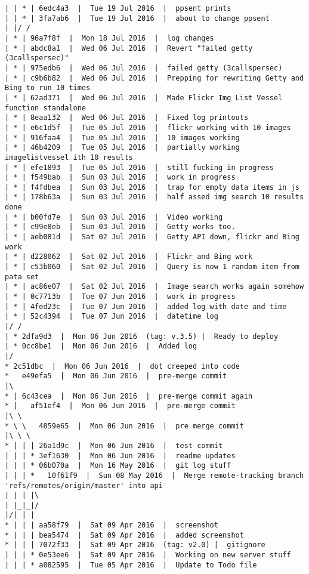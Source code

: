 \begin{verbatim}
| | * | 6edc4a3  |  Tue 19 Jul 2016  |  ppsent prints
| | * | 3fa7ab6  |  Tue 19 Jul 2016  |  about to change ppsent
| |/ /  
| * | 96a7f8f  |  Mon 18 Jul 2016  |  log changes
| * | abdc8a1  |  Wed 06 Jul 2016  |  Revert "failed getty (3callspersec)"
| * | 975edb6  |  Wed 06 Jul 2016  |  failed getty (3callspersec)
| * | c9b6b82  |  Wed 06 Jul 2016  |  Prepping for rewriting Getty and Bing to run 10 times
| * | 62ad371  |  Wed 06 Jul 2016  |  Made Flickr Img List Vessel function standalone
| * | 8eaa132  |  Wed 06 Jul 2016  |  Fixed log printouts
| * | e6c1d5f  |  Tue 05 Jul 2016  |  flickr working with 10 images
| * | 916faa4  |  Tue 05 Jul 2016  |  10 images working
| * | 46b4209  |  Tue 05 Jul 2016  |  partially working imagelistvessel ith 10 results
| * | efe1893  |  Tue 05 Jul 2016  |  still fucking in progress
| * | f549bab  |  Sun 03 Jul 2016  |  work in progress
| * | f4fdbea  |  Sun 03 Jul 2016  |  trap for empty data items in js
| * | 178b63a  |  Sun 03 Jul 2016  |  half assed img search 10 results done
| * | b00fd7e  |  Sun 03 Jul 2016  |  Video working
| * | c99e8eb  |  Sun 03 Jul 2016  |  Getty works too.
| * | aeb081d  |  Sat 02 Jul 2016  |  Getty API down, flickr and Bing work
| * | d228062  |  Sat 02 Jul 2016  |  Flickr and Bing work
| * | c53b060  |  Sat 02 Jul 2016  |  Query is now 1 random item from pata set
| * | ac86e07  |  Sat 02 Jul 2016  |  Image search works again somehow
| * | 0c7713b  |  Tue 07 Jun 2016  |  work in progress
| * | 4fed23c  |  Tue 07 Jun 2016  |  added log with date and time
| * | 52c4394  |  Tue 07 Jun 2016  |  datetime log
|/ /  
| * 2dfa9d3  |  Mon 06 Jun 2016  (tag: v.3.5) |  Ready to deploy
| * 0cc8be1  |  Mon 06 Jun 2016  |  Added log
|/  
* 2c51dbc  |  Mon 06 Jun 2016  |  dot creeped into code
*   e49efa5  |  Mon 06 Jun 2016  |  pre-merge commit
|\  
* | 6c43cea  |  Mon 06 Jun 2016  |  pre-merge commit again
* |   af51ef4  |  Mon 06 Jun 2016  |  pre-merge commit
|\ \  
* \ \   4859e65  |  Mon 06 Jun 2016  |  pre merge commit
|\ \ \  
* | | | 26a1d9c  |  Mon 06 Jun 2016  |  test commit
| | | * 3ef1630  |  Mon 06 Jun 2016  |  readme updates
| | | * 06b070a  |  Mon 16 May 2016  |  git log stuff
| | | *   10f61f9  |  Sun 08 May 2016  |  Merge remote-tracking branch 'refs/remotes/origin/master' into api
| | | |\  
| |_|_|/  
|/| | |   
* | | | aa58f79  |  Sat 09 Apr 2016  |  screenshot
* | | | bea5474  |  Sat 09 Apr 2016  |  added screenshot
* | | | 7072f33  |  Sat 09 Apr 2016  (tag: v2.0) |  gitignore
| | | * 0e53ee6  |  Sat 09 Apr 2016  |  Working on new server stuff
| | | * a082595  |  Tue 05 Apr 2016  |  Update to Todo file

\end{verbatim}
